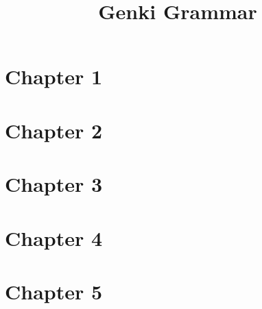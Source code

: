\documentclass{article}
\title{Genki Grammar}
\newcommand{\inputchapter}[2]{\section{Chapter #1}}
\begin{document}
\tableofcontents

\inputchapter{1}{01.tex}
\inputchapter{2}{02.tex}
\inputchapter{3}{03.tex}
\inputchapter{4}{04.tex}
\inputchapter{5}{05.tex}
\end{document}
